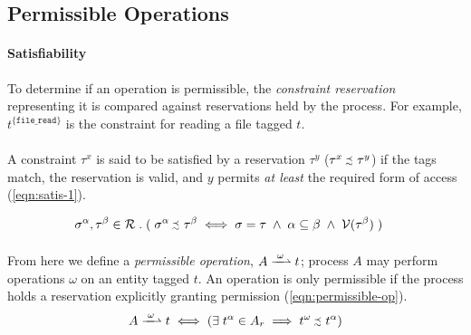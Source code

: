 \subsection{Permissible Operations}
\label{sec:permissible-operations}

\paragraph{Satisfiability} To determine if an operation is permissible, the \textit{constraint reservation} representing it is compared against reservations held by the process. For example, $t^{\{\texttt{file\_read}\}}$ is the constraint for reading a file tagged $t$.

\paragraph{} A constraint $\tau^{x}$ is said to be satisfied by a reservation $\tau^{y}$ ($\tau^{x} \sprecsim \tau^{y}$) if the tags match, the reservation is valid, and $y$ permits \textit{at least} the required form of access (\ref{eqn:satis-1}). 


\vspace{-5mm}
\begin{align}
    \sigma^{\alpha}, \tau^{\beta} \in \mathcal{R} &\;.\; (\; \sigma^{\alpha} \sprecsim \tau^{\beta} \iff \sigma = \tau \;\wedge\; \alpha \subseteq \beta \;\wedge\; \mathcal{V}(\tau^{\beta}) \;) \label{eqn:satis-1}
\end{align}


\paragraph{} From here we define a \textit{permissible operation}, $A \xrightharpoonup{\;\omega\;} t$; process $A$ may perform operations $\omega$ on an entity tagged $t$. An operation is only permissible if the process holds a reservation explicitly granting permission (\ref{eqn:permissible-op}).
\begin{equation}
    \label{eqn:permissible-op}
    A \xrightharpoonup{\;\omega\;} t \iff (\exists \; t^{\alpha} \in A_r \implies t^{\omega} \sprecsim t^{\alpha})
\end{equation}

